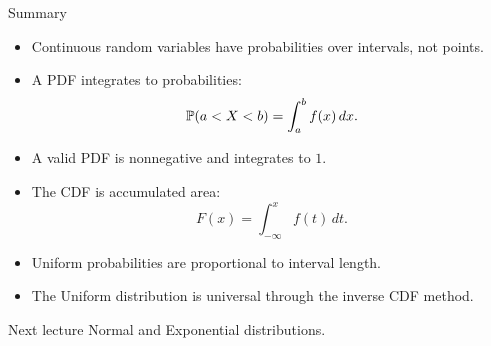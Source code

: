\begin{frame}{Summary}
\begin{itemize}
    \item Continuous random variables have probabilities over intervals, not points.

    \item A PDF integrates to probabilities:
    \[
    \mathbb{P}(a<X<b)=\int_a^b f(x)\,dx.
    \]

    \item A valid PDF is nonnegative and integrates to $1$.

    \item The CDF is accumulated area:
    \[
    F(x)=\int_{-\infty}^x f(t)\,dt.
    \]

    \item Uniform probabilities are proportional to interval length.

    \item The Uniform distribution is universal through the inverse CDF method.
\end{itemize}

\vspace{0.25cm}

\begin{keybox}{Next lecture}
Normal and Exponential distributions.
\end{keybox}
\end{frame}
